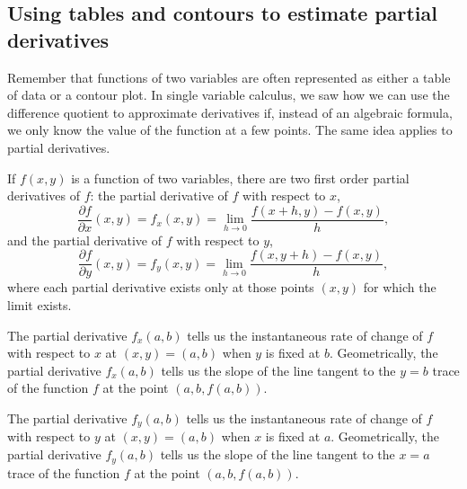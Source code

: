 

\subsection*{Using tables and contours to estimate partial
  derivatives} 

Remember that functions of two variables are often represented as either
a table of data or a contour plot.
In single variable calculus, we saw how we can use the difference
quotient to approximate derivatives if, instead of an algebraic
formula, we only know the value of the
function at a few points.
The same idea applies to partial derivatives.





\begin{summary}
\item If $f(x,y)$ is a function of two variables, there are two first
  order partial derivatives of $f$: the partial derivative of $f$ with respect to $x$,
      \[\frac{\partial f}{\partial x}(x,y) = f_x(x,y) = \lim_{h \to 0}
      \frac{f(x+h,y) - f(x,y)}{h},\]
      and the partial derivative of $f$ with respect to $y$,
      \[\frac{\partial f}{\partial y}(x,y) = f_y(x,y) = \lim_{h \to 0}
      \frac{f(x,y+h) - f(x,y)}{h},\] 
      where each partial derivative exists only at those points $(x,y)$ for which
      the limit exists.
  \item The partial derivative $f_x(a,b)$ tells us the instantaneous rate of
    change of $f$ with respect to $x$ at $(x,y) = (a,b)$ when $y$ is fixed at $b$.  Geometrically,
    the partial derivative $f_x(a,b)$ tells us the slope of the line
    tangent to the $y=b$ trace of the function $f$ at the point
    $(a,b,f(a,b))$.
  \item The partial derivative $f_y(a,b)$ tells us the instantaneous rate of
    change of $f$ with respect to $y$ at $(x,y) = (a,b)$ when $x$ is fixed at $a$.  Geometrically,
    the partial derivative $f_y(a,b)$ tells us the slope of the line
    tangent to the $x=a$ trace of the function $f$ at the point
    $(a,b,f(a,b))$.
\end{summary}


\nin \hrulefill



\clearpage